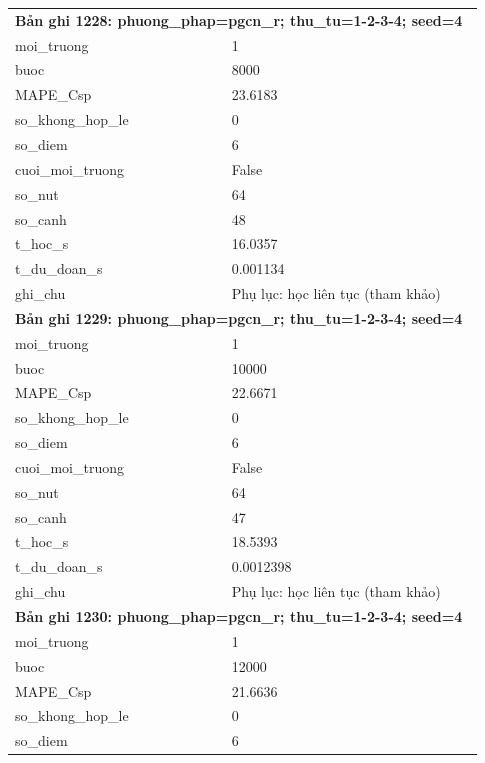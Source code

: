 \begin{longtable}{p{0.43\linewidth}p{0.50\linewidth}}
\midrule
\multicolumn{2}{p{0.95\linewidth}}{\textbf{Bản ghi 1228: phuong\_phap=pgcn\_r; thu\_tu=1-2-3-4; seed=4}} \\
moi\_\allowbreak truong & 1 \\
buoc & 8000 \\
MAPE\_\allowbreak Csp & 23.6183 \\
so\_\allowbreak khong\_\allowbreak hop\_\allowbreak le & 0 \\
so\_\allowbreak diem & 6 \\
cuoi\_\allowbreak moi\_\allowbreak truong & False \\
so\_\allowbreak nut & 64 \\
so\_\allowbreak canh & 48 \\
t\_\allowbreak hoc\_\allowbreak s & 16.0357 \\
t\_\allowbreak du\_\allowbreak doan\_\allowbreak s & 0.001134 \\
ghi\_\allowbreak chu & Phụ lục: học liên tục (tham khảo) \\
\midrule
\multicolumn{2}{p{0.95\linewidth}}{\textbf{Bản ghi 1229: phuong\_phap=pgcn\_r; thu\_tu=1-2-3-4; seed=4}} \\
moi\_\allowbreak truong & 1 \\
buoc & 10000 \\
MAPE\_\allowbreak Csp & 22.6671 \\
so\_\allowbreak khong\_\allowbreak hop\_\allowbreak le & 0 \\
so\_\allowbreak diem & 6 \\
cuoi\_\allowbreak moi\_\allowbreak truong & False \\
so\_\allowbreak nut & 64 \\
so\_\allowbreak canh & 47 \\
t\_\allowbreak hoc\_\allowbreak s & 18.5393 \\
t\_\allowbreak du\_\allowbreak doan\_\allowbreak s & 0.0012398 \\
ghi\_\allowbreak chu & Phụ lục: học liên tục (tham khảo) \\
\midrule
\multicolumn{2}{p{0.95\linewidth}}{\textbf{Bản ghi 1230: phuong\_phap=pgcn\_r; thu\_tu=1-2-3-4; seed=4}} \\
moi\_\allowbreak truong & 1 \\
buoc & 12000 \\
MAPE\_\allowbreak Csp & 21.6636 \\
so\_\allowbreak khong\_\allowbreak hop\_\allowbreak le & 0 \\
so\_\allowbreak diem & 6 \\

\end{longtable}
